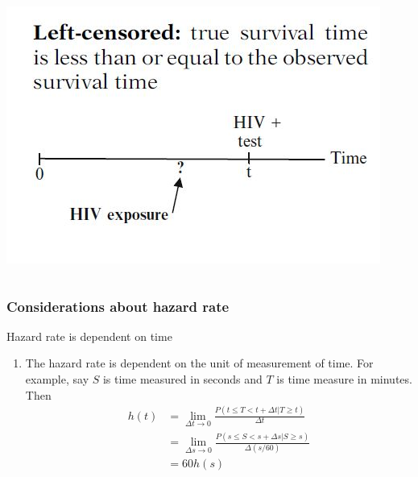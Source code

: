 \documentclass{beamer}
\theoremstyle{definition}
\begin{document}
\begin{frame}
\begin{columns}
\begin{column}{0.48\textwidth}
              \vspace{-20pt}
         \includegraphics[width =\textwidth]{Ch1-LeftCensor.JPG}
    \end{column}
\end{columns}
\end{frame}
\begin{frame} \frametitle{Considerations about hazard rate}
\begin{block}{Hazard rate is dependent on time}
\begin{enumerate}
\item The hazard rate is dependent on the unit of measurement of time. For example, say $S$ is time measured in seconds and $T$ is time measure in minutes. Then
\begin{align*}
h(t) & = \lim_{\Delta t \to 0} \frac{P( t \leq T < t+ \Delta t|T \ge t)}{\Delta t} \\
 & = \lim_{\Delta s \to 0} \frac{P( s \leq S < s + \Delta s |S \ge s)}{\Delta (s/60)} \\
 &  = 60h(s)
\end{align*}
\end{enumerate}
\end{block}
\end{frame}
\end{document}
